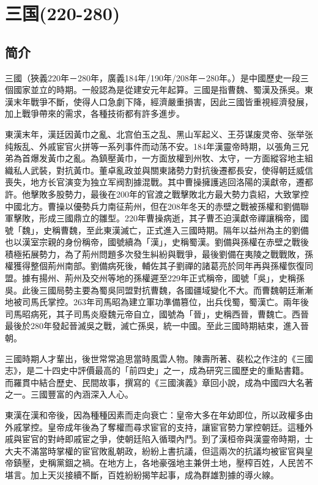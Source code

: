 
\chapter{三国\tiny(220-280)}

\section{简介}

三國（狹義220年－280年，廣義184年/190年/208年－280年。）是中國歷史一段三個國家並立的時期。一般認為是從建安元年起算。三國是指曹魏、蜀漢及孫吳。東漢末年戰爭不斷，使得人口急劇下降，經濟嚴重損害，因此三國皆重視經濟發展，加上戰爭帶來的需求，各種技術都有許多進步。

東漢末年，漢廷因黃巾之亂、北宫伯玉之乱、黑山军起义、王芬谋废灵帝、张举张纯叛乱、外戚宦官火拼等一系列事件而动荡不安。184年漢靈帝時期，以張角三兄弟為首爆发黃巾之亂。為鎮壓黃巾，一方面放權到州牧、太守，一方面縱容地主組織私人武裝，對抗黃巾。董卓亂政並與關東諸勢力對抗後遷都長安，使得朝廷威信喪失，地方长官演变为独立军阀割據混戰。其中曹操擁護逃回洛陽的漢獻帝，遷都許。他擊敗多股勢力，最後在200年的官渡之戰擊敗北方最大勢力袁紹，大致掌控中國北方。曹操以優勢兵力南征荊州，但在208年冬天的赤壁之戰被孫權和劉備聯軍擊敗，形成三國鼎立的雛型。220年曹操病逝，其子曹丕迫漢獻帝禪讓稱帝，國號「魏」，史稱曹魏，至此東漢滅亡，正式進入三國時期。隔年以益州為主的劉備也以漢室宗親的身份稱帝，國號續為「漢」，史稱蜀漢。劉備與孫權在赤壁之戰後積極拓展勢力，為了荊州問題多次發生糾紛與戰爭，最後劉備在夷陵之戰戰敗，孫權獲得整個荊州南部。劉備病死後，輔佐其子劉禪的諸葛亮於同年再與孫權恢復同盟。據有揚州、荊州及交州等地的孫權遲至229年正式稱帝，國號「吳」，史稱孫吳。此後三國局勢主要為蜀吳同盟對抗曹魏，各國疆域變化不大。而曹魏朝廷漸漸地被司馬氏掌控。263年司馬昭為建立軍功準備篡位，出兵伐蜀，蜀漢亡。兩年後司馬昭病死，其子司馬炎廢魏元帝自立，國號為「晉」，史稱西晉，曹魏亡。西晉最後於280年發起晉滅吳之戰，滅亡孫吳，統一中國。至此三國時期結束，進入晉朝。

三國時期人才輩出，後世常常追思當時風雲人物。陳壽所著、裴松之作注的《三國志》，是二十四史中評價最高的「前四史」之一，成為研究三國歷史的重點書籍。而羅貫中結合歷史、民間故事，撰寫的《三國演義》章回小說，成為中國四大名著之一。三國豐富的內涵深入人心。

東漢在漢和帝後，因為種種因素而走向衰亡：皇帝大多在年幼即位，所以政權多由外戚掌控。皇帝成年後為了奪權而尋求宦官的支持，讓宦官勢力掌控朝廷。這種外戚與宦官的對峙即戚宦之爭，使朝廷陷入循環內鬥。到了漢桓帝與漢靈帝時期，士大夫不滿當時掌權的宦官敗亂朝政，紛紛上書抗議，但這兩次的抗議均被宦官與皇帝鎮壓，史稱黨錮之禍。在地方上，各地豪强地主兼併土地，壓榨百姓，人民苦不堪言。加上天災接續不斷，百姓紛紛揭竿起事，成為群雄割據的導火線。

